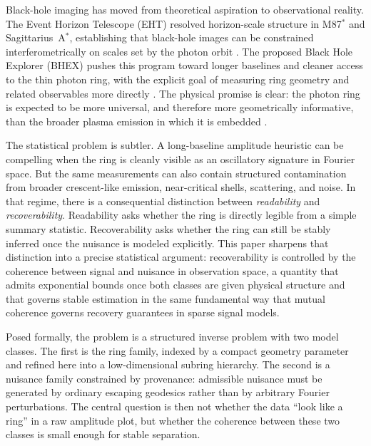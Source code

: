 \documentclass[11pt,a4paper]{article}
\theoremstyle{definition}
\theoremstyle{remark}
\begin{document}
Black-hole imaging has moved from theoretical aspiration to observational reality. The Event Horizon Telescope (EHT) resolved horizon-scale structure in M87$^\ast$ and Sagittarius~A$^\ast$, establishing that black-hole images can be constrained interferometrically on scales set by the photon orbit \citep{EHT2019M87,EHT2022SgrA}. The proposed Black Hole Explorer (BHEX) pushes this program toward longer baselines and cleaner access to the thin photon ring, with the explicit goal of measuring ring geometry and related observables more directly \citep{Johnson2024Vision,Lupsasca2024BHEX,Farah2025Spin}. The physical promise is clear: the photon ring is expected to be more universal, and therefore more geometrically informative, than the broader plasma emission in which it is embedded \citep{Johnson2020Universal,Gralla2019Shadow,Lupsasca2024BHEX}.

The statistical problem is subtler. A long-baseline amplitude heuristic can be compelling when the ring is cleanly visible as an oscillatory signature in Fourier space. But the same measurements can also contain structured contamination from broader crescent-like emission, near-critical shells, scattering, and noise. In that regime, there is a consequential distinction between \emph{readability} and \emph{recoverability}. Readability asks whether the ring is directly legible from a simple summary statistic. Recoverability asks whether the ring can still be stably inferred once the nuisance is modeled explicitly. This paper sharpens that distinction into a precise statistical argument: recoverability is controlled by the coherence between signal and nuisance in observation space, a quantity that admits exponential bounds once both classes are given physical structure and that governs stable estimation in the same fundamental way that mutual coherence governs recovery guarantees in sparse signal models.

Posed formally, the problem is a structured inverse problem with two model classes. The first is the ring family, indexed by a compact geometry parameter and refined here into a low-dimensional subring hierarchy. The second is a nuisance family constrained by provenance: admissible nuisance must be generated by ordinary escaping geodesics rather than by arbitrary Fourier perturbations. The central question is then not whether the data ``look like a ring'' in a raw amplitude plot, but whether the coherence between these two classes is small enough for stable separation.
\end{document}
